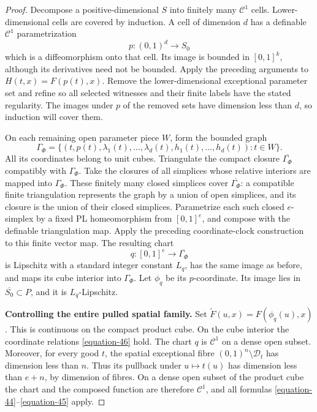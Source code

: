 \documentclass[11pt,a4paper]{article}
\theoremstyle{definition}
\begin{document}
\begin{proof}
Decompose a positive-dimensional \(S\) into finitely many
\(\mathcal C^1\) cells. Lower-dimensional cells are covered by
induction. A cell of dimension \(d\) has a definable
\(\mathcal C^1\) parametrization
\[
 p:(0,1)^d\longrightarrow S_0
\]
which is a diffeomorphism onto that cell. Its image is bounded
in \([0,1]^k\), although its derivatives need not be bounded.
Apply the preceding arguments to \(H(t,x)=F(p(t),x)\).
Remove the lower-dimensional exceptional parameter set and
refine so all selected witnesses and their finite labels have
the stated regularity. The images under \(p\) of the removed
sets have dimension less than \(d\), so induction will cover
them.

On each remaining open parameter piece \(W\), form the bounded
graph
\begin{equation}
 \Gamma_\Phi=
 \{(t,p(t),\lambda_1(t),\ldots,\lambda_d(t),
                    h_1(t),\ldots,h_d(t)):t\in W\}.
 \label{equation-46}
\end{equation}
All its coordinates belong to unit cubes. Triangulate the compact
closure \(\overline{\Gamma_\Phi}\) compatibly with
\(\Gamma_\Phi\). Take the closures of all simplices whose relative
interiors are mapped into \(\Gamma_\Phi\). These finitely many
closed simplices cover \(\overline{\Gamma_\Phi}\): a compatible
finite triangulation represents the graph by a union of open
simplices, and its closure is the union of their closed
simplices. Parametrize each such closed \(e\)-simplex by a fixed
PL homeomorphism from \([0,1]^e\), and compose with the definable
triangulation map. Apply the preceding coordinate-clock
construction to this finite vector map. The resulting chart
\[
 q:[0,1]^e\longrightarrow\overline{\Gamma_\Phi}
\]
is Lipschitz with a standard integer constant \(L_q\), has the
same image as before, and maps its cube interior into
\(\Gamma_\Phi\). Let \(\phi_q\) be its \(p\)-coordinate.
Its image lies in \(\overline{S_0}\subset P\), and it is
\(L_q\)-Lipschitz.

\textbf{Controlling the entire pulled spatial family.}
Set \(\widetilde F(u,x)=F(\phi_q(u),x)\). This is continuous on
the compact product cube. On the cube interior the coordinate
relations \eqref{equation-46} hold. The chart \(q\) is \(\mathcal C^1\) on
a dense open subset. Moreover, for every good \(t\), the spatial
exceptional fibre \((0,1)^n\setminus\mathcal D_t\) has dimension
less than \(n\). Thus its pullback under \(u\mapsto t(u)\) has
dimension less than \(e+n\), by dimension of fibres. On a dense
open subset of the product cube the chart and the composed
function are therefore \(\mathcal C^1\), and all formulas
\eqref{equation-44}--\eqref{equation-45} apply.


\end{proof}
\end{document}
